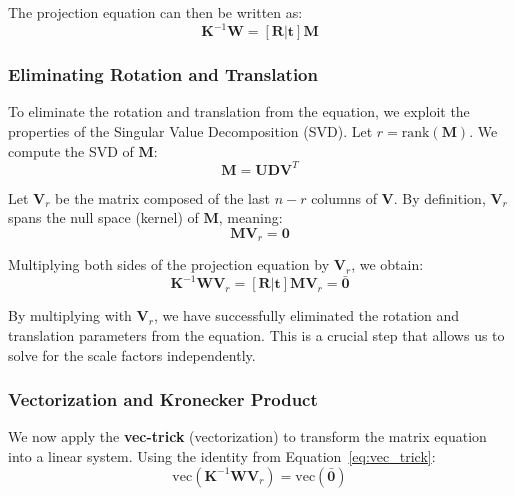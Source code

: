 \documentclass[11pt,a4paper]{article}
\theoremstyle{definition}
\theoremstyle{plain}
\theoremstyle{remark}
\begin{document}
The projection equation can then be written as:
\begin{equation} \nonumber
\mathbf{K}^{-1} \mathbf{W} = \mathbf{[R|t]} \mathbf{M}
\end{equation}

\subsubsection{Eliminating Rotation and Translation}

To eliminate the rotation and translation from the equation, we exploit the properties of the Singular Value Decomposition (SVD). Let $r = \text{rank}(\mathbf{M})$. We compute the SVD of $\mathbf{M}$:
\begin{equation} \nonumber
\mathbf{M} = \mathbf{U} \mathbf{D} \mathbf{V}^T
\end{equation}

Let $\mathbf{V}_r$ be the matrix composed of the last $n-r$ columns of $\mathbf{V}$. By definition, $\mathbf{V}_r$ spans the null space (kernel) of $\mathbf{M}$, meaning:
\begin{equation} \nonumber
\mathbf{M} \mathbf{V}_r = \mathbf{0}
\end{equation}

Multiplying both sides of the projection equation by $\mathbf{V}_r$, we obtain:
\begin{equation} \nonumber
\mathbf{K}^{-1} \mathbf{W} \mathbf{V}_r = \mathbf{[R|t]} \mathbf{M} \mathbf{V}_r = \bar{\mathbf{0}}
\end{equation}

\begin{tcolorbox}[colback=orange!5!white,colframe=orange!75!black,title=\textbf{Elimination of Pose Parameters}]
By multiplying with $\mathbf{V}_r$, we have successfully eliminated the rotation and translation parameters from the equation. This is a crucial step that allows us to solve for the scale factors independently.
\end{tcolorbox}

\subsubsection{Vectorization and Kronecker Product}

We now apply the \textbf{vec-trick} (vectorization) to transform the matrix equation into a linear system. Using the identity from Equation~\eqref{eq:vec_trick}:
\begin{equation} \nonumber
\text{vec}(\mathbf{K}^{-1} \mathbf{W} \mathbf{V}_r) = \text{vec}(\bar{\mathbf{0}})
\end{equation}
\end{document}
